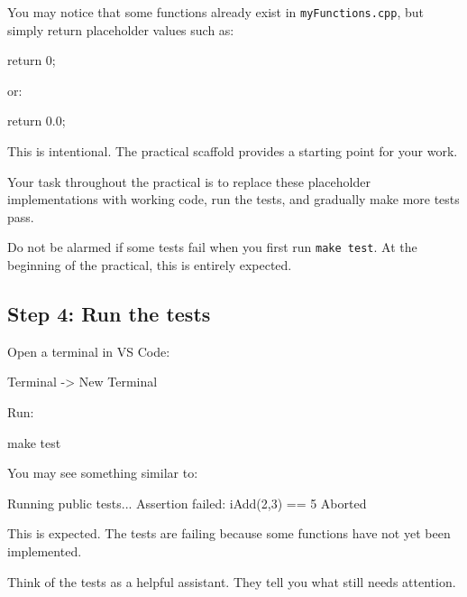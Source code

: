 \documentclass{csc2059practical}
\begin{document}
\begin{importantnote}
You may notice that some functions already exist in \texttt{myFunctions.cpp}, but simply return placeholder values such as:

\begin{cppcode}
return 0;
\end{cppcode}

or:

\begin{cppcode}
return 0.0;
\end{cppcode}

This is intentional. The practical scaffold provides a starting point for your work.

Your task throughout the practical is to replace these placeholder implementations with working code, run the tests, and gradually make more tests pass.
\end{importantnote}

\begin{tipbox}
Do not be alarmed if some tests fail when you first run \texttt{make test}. At the beginning of the practical, this is entirely expected.
\end{tipbox}

\subsection{Step 4: Run the tests}

Open a terminal in VS Code:

\begin{terminal}
Terminal -> New Terminal
\end{terminal}

Run:

\begin{bashcode}
make test
\end{bashcode}

You may see something similar to:

\begin{terminal}
Running public tests...
Assertion failed:
iAdd(2,3) == 5
Aborted
\end{terminal}

This is expected. The tests are failing because some functions have not yet been implemented.

\begin{tipbox}
Think of the tests as a helpful assistant. They tell you what still needs attention.
\end{tipbox}
\end{document}
